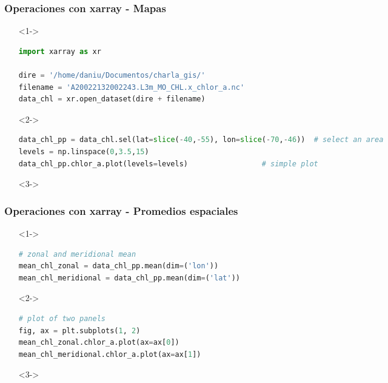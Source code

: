 \documentclass{beamer}
\begin{document}
\begin{frame}[t,fragile]
\frametitle{Operaciones con xarray - Mapas}
\begin{itemize}
	\item[]<1->
\begin{lstlisting}[language=python, basicstyle=\scriptsize]
import xarray as xr

dire = '/home/daniu/Documentos/charla_gis/'
filename = 'A20022132002243.L3m_MO_CHL.x_chlor_a.nc'
data_chl = xr.open_dataset(dire + filename)
\end{lstlisting}
	\item[]<2->
\begin{lstlisting}[language=python, basicstyle=\scriptsize]
data_chl_pp = data_chl.sel(lat=slice(-40,-55), lon=slice(-70,-46))	# select an area
levels = np.linspace(0,3.5,15)
data_chl_pp.chlor_a.plot(levels=levels)					# simple plot
\end{lstlisting}
	\item[]<3->
\begin{figure}
	
	
\end{figure}
\end{itemize}
\end{frame}

\begin{frame}[t, fragile]
\frametitle{Operaciones con xarray - Promedios espaciales}
\begin{itemize}
	
	\item[]<1->
\begin{lstlisting}[language=python, basicstyle=\scriptsize]
# zonal and meridional mean
mean_chl_zonal = data_chl_pp.mean(dim=('lon'))
mean_chl_meridional = data_chl_pp.mean(dim=('lat'))
\end{lstlisting}
	
	\item[]<2->
	\begin{lstlisting}[language=python, basicstyle=\scriptsize]
# plot of two panels
fig, ax = plt.subplots(1, 2)
mean_chl_zonal.chlor_a.plot(ax=ax[0])
mean_chl_meridional.chlor_a.plot(ax=ax[1])
	\end{lstlisting}
	
	\item[]<3->	
	\begin{figure}
	\end{figure}
	
\end{itemize}

\end{frame}
\end{document}
